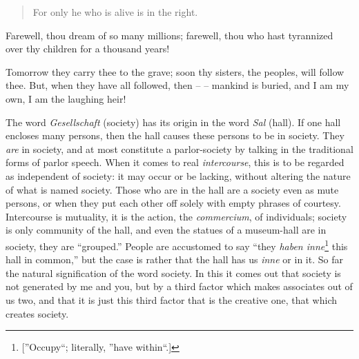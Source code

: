\begin{quotation}

\noindent{}For only he who is alive is in the right.\end{quotation}

\noindent{}Farewell, thou dream of so many millions; farewell, thou who hast 
tyrannized over thy children for a thousand years!

Tomorrow they carry thee to the grave; soon thy sisters, the peoples, will 
follow thee. But, when they have all followed, then -- -- mankind is buried, 
and I am my own, I am the laughing heir!

\myhrule


The word \textit{Gesellschaft} (society) has its origin in the word 
\textit{Sal} (hall). If one hall encloses many persons, then the hall causes 
these persons to be in society. They \textit{are} in society, and at most 
constitute a parlor-society by talking in the traditional forms of parlor 
speech. When it comes to real \textit{intercourse}, this is to be regarded as 
independent of society: it may occur or be lacking, without altering the 
nature of what is named society. Those who are in the hall are a society even 
as mute persons, or when they put each other off solely with empty phrases of 
courtesy. Intercourse is mutuality, it is the action, the \textit{commercium}, 
of individuals; society is only community of the hall, and even the statues of 
a museum-hall are in society, they are ``grouped.'' People are accustomed to 
say ``they \textit{haben inne}\footnote{[''Occupy``; literally, ''have 
within``.]} this hall in common,'' but the case is rather that the hall has 
us \textit{inne} or in it. So far the natural signification of the word 
society. In this it comes out that society is not generated by me and you, but 
by a third factor which makes associates out of us two, and that it is just 
this third factor that is the creative one, that which creates society.

